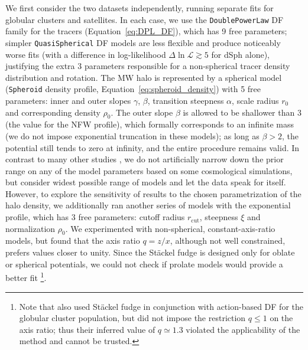 \documentclass[usenatbib,fleqn]{mnras}
\begin{document}
We first consider the two datasets independently, running separate fits for globular clusters and satellites. In each case, we use the \texttt{DoublePowerLaw} DF family for the tracers (Equation~\ref{eq:DPL_DF}), which has 9 free parameters; simpler \texttt{QuasiSpherical} DF models are less flexible and produce noticeably worse fits (with a difference in log-likelihood $\Delta \ln \mathcal L \gtrsim 5$ for dSph alone), justifying the extra 3 parameters responsible for a non-spherical tracer density distribution and rotation. The MW halo is represented by a spherical \citet{Zhao1996} model (\texttt{Spheroid} density profile, Equation~\ref{eq:spheroid_density}) with 5 free parameters: inner and outer slopes $\gamma$, $\beta$, transition steepness $\alpha$, scale radius $r_0$ and corresponding density $\rho_0$. The outer slope $\beta$ is allowed to be shallower than 3 (the value for the NFW profile), which formally corresponds to an infinite mass (we do not impose exponential truncation in these models); as long as $\beta>2$, the potential still tends to zero at infinity, and the entire procedure remains valid.
In contrast to many other studies \citep[e.g.,][]{Eadie2019,Deason2021}, we do not artificially narrow down the prior range on any of the model parameters based on some cosmological simulations, but consider widest possible range of models and let the data speak for itself. However, to explore the sensitivity of results to the chosen parametrization of the halo density, we additionally ran another series of models with the exponential \citet{Einasto1965} profile, which has 3 free parameters: cutoff radius $r_\text{cut}$, steepness $\xi$ and normalization $\rho_0$.
We experimented with non-spherical, constant-axis-ratio models, but found that the axis ratio $q=z/x$, although not well constrained, prefers values closer to unity. Since the St\"ackel fudge is designed only for oblate or spherical potentials, we could not check if prolate models would provide a better fit%
\footnote{Note that \citet{Posti2019} also used St\"ackel fudge in conjunction with action-based DF for the globular cluster population, but did not impose the restriction $q\le 1$ on the axis ratio; thus their inferred value of $q\simeq1.3$ violated the applicability of the method and cannot be trusted.}.
\end{document}
